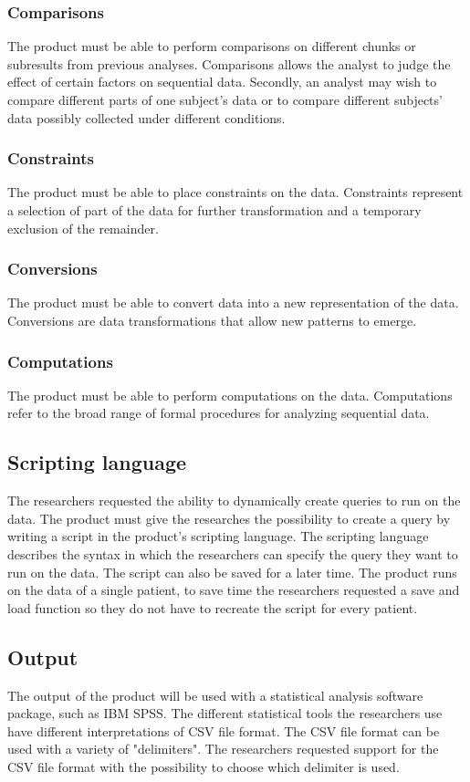 \documentclass[11pt,twoside,a4paper]{article}
\begin{document}
\subsubsection{Comparisons}
The product must be able to perform comparisons on different chunks or subresults from previous analyses. Comparisons allows the analyst to judge the effect of certain factors on sequential data. Secondly, an analyst may wish to compare different parts of one subject’s data or to compare different subjects’ data possibly collected under different conditions.

\subsubsection{Constraints}
The product must be able to place constraints on the data. Constraints represent a selection of part of the data for further transformation and a temporary exclusion of the remainder. 

\subsubsection{Conversions}
The product must be able to convert data into a new representation of the data. Conversions are data transformations that allow new patterns to emerge.

\subsubsection{Computations}
The product must be able to perform computations on the data. Computations refer to the broad range of formal procedures for analyzing sequential data.

\subsection{Scripting language}
The researchers requested the ability to dynamically create queries to run on the data. The product must give the researches the possibility to create a query by writing a script in the product's scripting language. The scripting language describes the syntax in which the researchers can specify the query they want to run on the data. The script can also be saved for a later time. The product runs on the data of a single patient, to save time the researchers requested a save and load function so they do not have to recreate the script for every patient.

\subsection{Output}
The output of the product will be used with a statistical analysis software package, such as IBM SPSS. The different statistical tools the researchers use have different interpretations of CSV file format. The CSV file format can be used with a variety of "delimiters". The researchers requested support for the CSV file format with the possibility to choose which delimiter is used.
\end{document}
